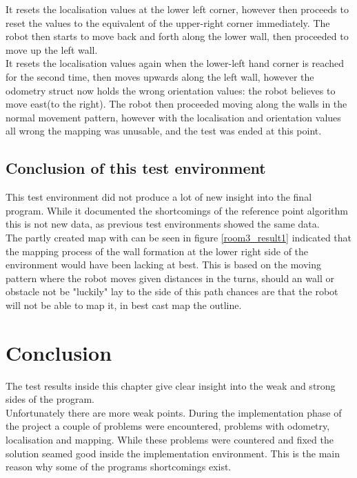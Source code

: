 It resets the localisation values at the lower left corner, however then proceeds to reset the values to the equivalent of the upper-right corner immediately. The robot then starts to move back and forth along the lower wall, then proceeded to move up the left wall. \\
It resets the localisation values again when the lower-left hand corner is reached for the second time, then moves upwards along the left wall, however the odometry struct now holds the wrong orientation values: the robot believes to move east(to the right).
The robot then proceeded moving along the walls in the normal movement pattern, however with the localisation and orientation values all wrong the mapping was unusable, and the test was ended at this point.

\subsection{Conclusion of this test environment}
This test environment did not produce a lot of new insight into the final program. While it documented the shortcomings of the reference point algorithm this is not new data, as previous test environments showed the same data. \\
The partly created map with can be seen in figure \ref{room3_result1} indicated that the mapping process of the wall formation at the lower right side of the environment would have been lacking at best. This is based on the moving pattern where the robot moves given distances in the turns, should an wall or obstacle not be "luckily" lay to the side of this path chances are that the robot will not be able to map it, in best cast map the outline. \\

\section{Conclusion}
The test results inside this chapter give clear insight into the weak and strong sides of the program.\\
Unfortunately there are more weak points. During the implementation phase of the project a couple of problems were encountered, problems with odometry, localisation and mapping. While these problems were countered and fixed the solution seamed good inside the implementation environment. This is the main reason why some of the programs shortcomings exist.\\[3ex]


